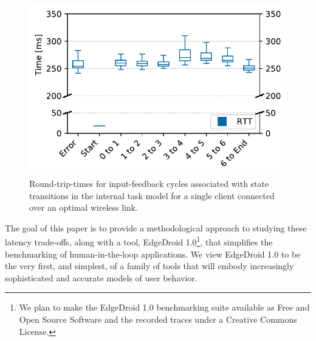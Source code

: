 \begin{figure}%
    \centering%
    \includegraphics[width=.85\columnwidth]{publications/2019EdgeDroid/plots/comparison/nofonts/box_taskstep}%
    \caption{Round-trip-times for input-feedback cycles associated with state transitions in the internal task model for a single client connected over an optimal wireless link.}%
    \label{fig:comparison:tasksteps}
\end{figure}%

The goal of this paper is to provide a methodological approach to studying these latency trade-offs, along with a tool, EdgeDroid 1.0\footnote{We plan to make the EdgeDroid 1.0 benchmarking suite available as Free and Open Source Software and the recorded traces under a Creative Commons License.}, that simplifies the benchmarking of human-in-the-loop applications.
We view EdgeDroid 1.0 to be the very first, and simplest, of a family of tools that will embody increasingly sophisticated and accurate models of user behavior.

